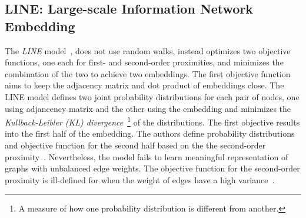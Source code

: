 \subsection{LINE: Large-scale Information Network Embedding}
\label{subsec:LINE}
The \emph{LINE} model~, does not use random walks, instead optimizes two objective functions, one each for
first- and second-order proximities, and minimizes the combination
of the two to achieve two embeddings. The first objective function aims to keep the adjacency matrix and dot product of embeddings close. The LINE model defines
two joint probability distributions for each pair of nodes, one
using adjancency matrix and the other using the embedding and minimizes the \emph{Kullback-Leibler (KL) divergence}~\footnote{A measure of how one probability distribution is different from another.} of the distributions. The first objective results into the first half of the embedding. The authors define probability distributions and
objective function for the second half based on the the second-order proximity~. Nevertheless, the model fails to learn meaningful representation of graphs with unbalanced edge weights. The objective function for the second-order proximity is ill-defined for when the weight
of edges have a high variance~. 
